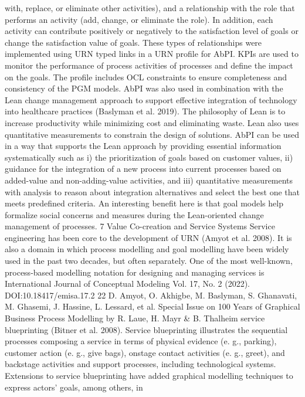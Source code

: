 with, replace, or eliminate other activities), and a
relationship with the role that performs an activity
(add, change, or eliminate the role). In addition,
each activity can contribute positively or negatively to the satisfaction level of goals or change
the satisfaction value of goals. These types of
relationships were implemented using URN typed
links in a URN profile for AbPI. KPIs are used
to monitor the performance of process activities
of processes and define the impact on the goals.
The profile includes OCL constraints to ensure
completeness and consistency of the PGM models.
AbPI was also used in combination with the
Lean change management approach to support
effective integration of technology into healthcare
practices (Baslyman et al. 2019). The philosophy
of Lean is to increase productivity while minimizing cost and eliminating waste. Lean also
uses quantitative measurements to constrain the
design of solutions. AbPI can be used in a way
that supports the Lean approach by providing essential information systematically such as i) the
prioritization of goals based on customer values,
ii) guidance for the integration of a new process
into current processes based on added-value and
non-adding-value activities, and iii) quantitative
measurements with analysis to reason about integration alternatives and select the best one that
meets predefined criteria. An interesting benefit
here is that goal models help formalize social
concerns and measures during the Lean-oriented
change management of processes.
7 Value Co-creation and Service Systems
Service engineering has been core to the development of URN (Amyot et al. 2008). It is also
a domain in which process modelling and goal
modelling have been widely used in the past
two decades, but often separately. One of the
most well-known, process-based modelling notation for designing and managing services is
International Journal of Conceptual Modeling
Vol. 17, No. 2 (2022). DOI:10.18417/emisa.17.2
22 D. Amyot, O. Akhigbe, M. Baslyman, S. Ghanavati, M. Ghasemi, J. Hassine, L. Lessard, et al.
Special Issue on 100 Years of Graphical Business Process Modelling by R. Laue, H. Mayr & B. Thalheim
service blueprinting (Bitner et al. 2008). Service
blueprinting illustrates the sequential processes
composing a service in terms of physical evidence (e. g., parking), customer action (e. g., give
bags), onstage contact activities (e. g., greet), and
backstage activities and support processes, including technological systems. Extensions to service
blueprinting have added graphical modelling techniques to express actors’ goals, among others, in
